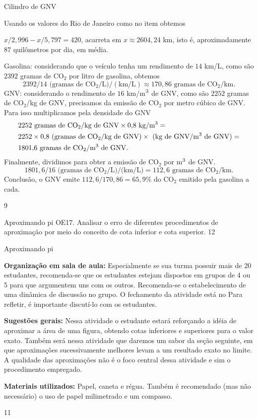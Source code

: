\begin{answer}{Cilindro de GNV}
{Usando os valores do Rio de Janeiro como no item  obtemos

$x/2{,}996 - x/5{,}797 = 420$, acarreta em $x\approx2604{,}24$ km, isto é, aproximadamente $87$ quilômetros por dia, em média.

Gasolina: considerando que o veículo tenha um rendimento de $14$ km/L, como são $2392$ gramas de CO$_2$ por litro de gasolina, obtemos
\begin{equation*}
2392/14 \text{ (gramas de CO\(_2\)}/\text{L})/(\text{km}/\text{L})\approx170{,}86\text{ gramas de CO\(_2\)/km}.
\end{equation*}
GNV: considerando o rendimento de $16$ km/m\(\sp{3}\) de GNV, como são $2252$ gramas de CO\(_2\)/kg de GNV, precisamos da emissão de CO\(_2\) por metro cúbico de GNV. Para isso multiplicamos pela densidade do GNV
\begin{align*}
&2252\text{ gramas de CO\(_2\)/kg de GNV} \times 0{,}8\text{ kg/m\(\sp{3}\)} =\\
&2252\times0{,}8\text{ (gramas de CO\(_2\)/kg de GNV)} \times \text{ (kg de GNV/m\(\sp{3}\) de GNV)}  =\\
&1801{,}6\text{ gramas de CO\(_2\)/m\(\sp{3}\) de GNV}.
\end{align*}
Finalmente, dividimos para obter a emissão de CO\(_2\) por m\(\sp{3}\) de GNV.
\begin{equation*}
1801{,}6/16\text{ (gramas de CO\(_2\)/L)/(km/L)} = 112{,}6\text{ gramas de CO\(_2\)/km.}
\end{equation*}
Conclusão, o GNV emite $112{,}6/170{,}86=65{,}9\%$ do CO$_2$ emitido pela gasolina a cada.
}{9}
\end{answer}
\begin{objectives}{Aproximando pi}
{
OE17. Analisar o erro de diferentes procedimentos de aproximação por meio do conceito de cota inferior e cota superior.
}{1}{2}
\end{objectives}
\begin{sugestions}{Aproximando pi}
{
\textbf{Organização em sala de aula:} Especialmente se sua turma possuir mais de 20 estudantes, recomenda-se que os estudantes estejam dispostos em grupos de 4 ou 5 para que argumentem uns com os outros. Recomenda-se o estabelecimento de uma dinâmica de discussão no grupo. O fechamento da atividade está no Para refletir, é importante discutí-lo com os estudantes.

\textbf{Sugestões gerais:} Nessa atividade o estudante estará reforçando a idéia de aproximar a área de uma figura, obtendo cotas inferiores e superiores para o valor exato. Também será nessa atividade que daremos um sabor da seção seguinte, em que aproximações sucessivamente melhores levam a um resultado exato no limite.
A qualidade das aproximações não é o foco central dessa atividade e sim o procedimento empregado.

\textbf{Materiais utilizados:} Papel, caneta e régua. Também é recomendado (mas não necessário) o uso de papel milimetrado e um compasso.
}{1}{1}
\end{sugestions}

